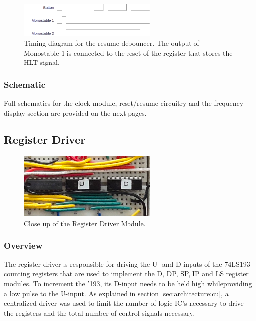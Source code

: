 \begin{figure}[H]
  \centering
  \includegraphics[width=0.6\textwidth]{img/resumedebounce}
  \caption{Timing diagram for the resume debouncer. The output of Monostable 1 is connected to the reset of the register that stores the HLT signal.}
  \label{fig:resumedebounce}
\end{figure}


\subsubsection{Schematic}
Full schematics for the clock module, reset/resume circuitry and the frequency display section are provided on the next pages.




\subsection{Register Driver} \label{sec:implementation:registerdriver}
\begin{figure}[H]
  \centering
  \includegraphics[width=0.6\textwidth]{img/registerdrivercloseup}
  \caption{Close up of the Register Driver Module.}
  \label{fig:registerdrivercloseup}
\end{figure}

\subsubsection{Overview}
The register driver is responsible for driving the U- and D-inputs of the 74LS193 counting registers that are used to implement the D, DP, SP, IP and LS register modules. To increment the '193, its D-input needs to be held high whileproviding a low pulse to the U-input. As explained in section \ref{sec:architecture:cu}, a centralized driver was used to limit the number of logic IC's necessary to drive the registers and the total number of control signals necessary.

